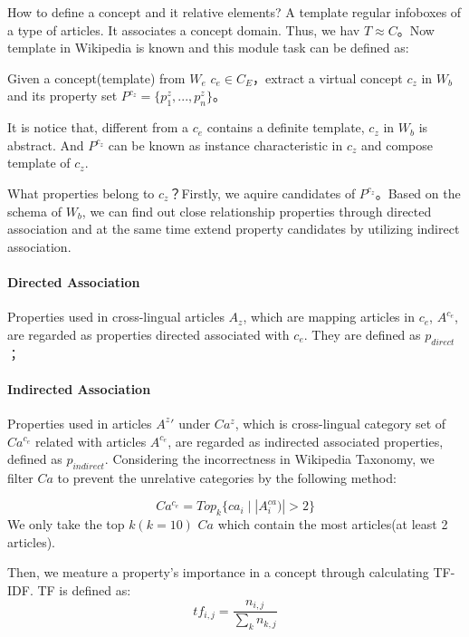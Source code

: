 \documentclass[runningheads,a4paper]{llncs}
\begin{document}
How to define a concept and it relative elements? A template regular infoboxes of a type of articles. It associates a concept domain. Thus, we hav $T \approx C$。Now template in Wikipedia is known and this module task can be defined as:
\begin{definition}
Given a concept(template) from $W_e$ $c_e \in C_E$，extract a virtual concept $c_z$ in $W_b$ and its property set $P^{c_z}=\{p_1^z,...,p_n^z\}$。
\end{definition}
It is notice that, different from a $c_e$ contains a definite template, $c_z$ in $W_b$ is abstract. And $P^{c_z}$ can be known as instance characteristic in $c_z$ and compose template of $c_z$.

What properties belong to $c_z$？Firstly, we aquire candidates of $P^{c_z}$。Based on the schema of $W_b$, we can find out close relationship properties through directed association and at the same time extend property candidates by utilizing indirect association.

\paragraph{ Directed Association } Properties used in cross-lingual articles $A_z$, which are mapping articles in $c_e$, $A^{c_e}$, are regarded as properties directed associated with $c_e$. They are defined as $p_{direct}$；

\paragraph {Indirected Association} Properties used in articles ${A^z}'$ under $Ca^{z}$, which is cross-lingual category set of $Ca^{c_e}$ related with articles $A^{c_e}$, are regarded as indirected associated properties, defined as $p_{indirect}$. Considering the incorrectness in Wikipedia Taxonomy, we filter $Ca$ to prevent the unrelative categories by the following method:

\begin{equation}
Ca^{c_e} = Top_k\{ ca_i\mid |A^{ca}_i)| > 2 \}
\end{equation}
We only take the top $k(k=10)$ $Ca$ which contain the most articles(at least 2 articles). 

Then, we meature a property's importance in a concept through calculating TF-IDF. TF is defined as:
\begin{equation}
\label{equ:tf}
tf_{i,j}=\frac{n_{i,j}}{\sum_{k}{n_{k,j}}}
\end{equation}
\end{document}

